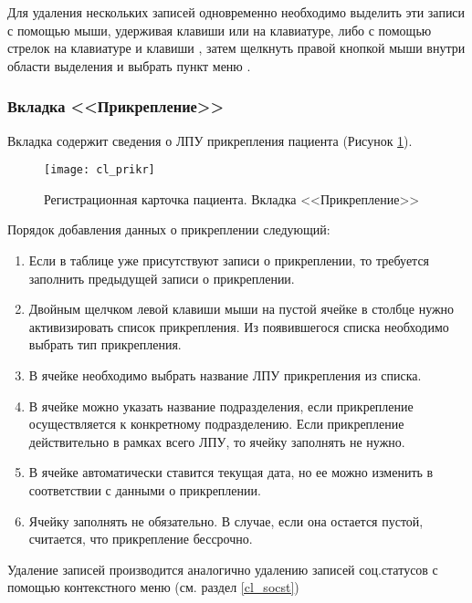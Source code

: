 \begin{prim}
Для удаления нескольких записей одновременно необходимо выделить эти записи с помощью мыши, удерживая клавиши  или  на клавиатуре, либо с помощью стрелок на клавиатуре и клавиши , затем щелкнуть правой кнопкой мыши внутри области выделения и выбрать пункт меню .
\end{prim}

\subsubsection{Вкладка <<Прикрепление>>}

Вкладка  содержит сведения о ЛПУ прикрепления пациента (Рисунок \ref{img_cl_prikr}).

\begin{figure}[ht]\centering
 \texttt{[image: cl\_prikr]}
 \caption{Регистрационная карточка пациента. Вкладка <<Прикрепление>>}
 \label{img_cl_prikr}
\end{figure} 

Порядок добавления данных о прикреплении следующий:
\begin{enumerate}
 \item Если в таблице уже присутствуют записи о прикреплении, то требуется заполнить  предыдущей записи о прикреплении.
 \item Двойным щелчком левой клавиши мыши на пустой ячейке в столбце  нужно активизировать список прикрепления. Из появившегося списка необходимо выбрать тип прикрепления.
 \item В ячейке  необходимо выбрать название ЛПУ прикрепления из списка.
 \item В ячейке  можно указать название подразделения, если прикрепление осуществляется к конкретному подразделению. Если прикрепление действительно в рамках всего ЛПУ, то ячейку заполнять не нужно.
 \item В ячейке  автоматически ставится текущая дата, но ее можно изменить в соответствии с данными о прикреплении.
 \item Ячейку  заполнять не обязательно. В случае, если она остается пустой, считается, что прикрепление бессрочно.
\end{enumerate}
 
Удаление записей производится аналогично удалению записей соц.статусов с помощью контекстного меню (см. раздел \ref{cl_socst})

